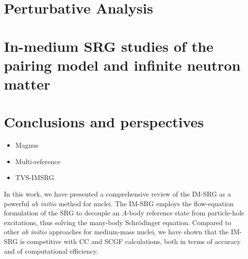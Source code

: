 

\section{Perturbative Analysis}


\section{In-medium SRG studies of the pairing model and infinite neutron matter}

\section{\label{sec:perspectives}Conclusions and perspectives}
\begin{itemize}
\item Magnus
\item Multi-reference
\item TVS-IMSRG
\end{itemize}


In this work, we have presented a comprehensive review of the IM-SRG
as a powerful \emph{ab initio} method for nuclei. The IM-SRG employs
the flow-equation formulation of the SRG to decouple an $A$-body
reference state from particle-hole excitations, thus solving the
many-body Schr\"odinger equation. Compared to other \emph{ab initio}
approaches for medium-mass nuclei, we have shown that the IM-SRG is
competitive with CC and SCGF calculations, both in terms of accuracy and of
computational efficiency.

